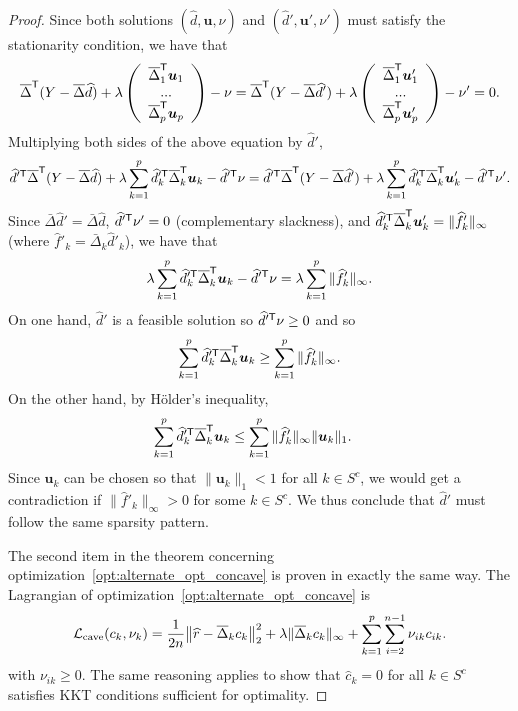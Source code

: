 \documentclass[12pt,pdftex,aos,noinfoline,addressasfootnote]{imsart}
\begin{document}
\begin{proof}
Since both solutions $(\hat{d}, \mathbf{u}, \nu)$ and $(\hat{d}',
\mathbf{u}', \nu')$ must satisfy the stationarity condition, we have
that
\[
\overline{\Delta}^{\mathsf{T}} ( Y - \overline{\Delta} \widehat{d} ) 
   + \lambda \left( \begin{array}{c} 
          \overline{\Delta}_1^{\mathsf{T}} \mbox{\boldmath $u$}_1  
          \\ ... \\ \overline{\Delta}_p^{\mathsf{T}} \mbox{\boldmath $u$}_p \end{array} \right)
    - \nu = 
\overline{\Delta}^{\mathsf{T}} ( Y - \overline{\Delta} \widehat{d}' ) 
   + \lambda \left( \begin{array}{c} 
          \overline{\Delta}_1^{\mathsf{T}} \mbox{\boldmath $u$}'_1  
          \\ ... \\ \overline{\Delta}_p^{\mathsf{T}} \mbox{\boldmath $u$}'_p \end{array} \right)
 - \nu' = 0.
\] 
Multiplying both sides of the above equation by $\hat{d}'$,
\[
\widehat{d}'^{\mathsf{T}}  \overline{\Delta}^{\mathsf{T}} ( Y - \overline{\Delta} \widehat{d} ) 
    + \lambda \sum_{k=1}^p \widehat{d}'^{\mathsf{T}}_k \overline{\Delta}_k^{\mathsf{T}} \mbox{\boldmath $u$}_k - \widehat{d}'^{\mathsf{T}} \nu = \widehat{d}'^{\mathsf{T}}  \overline{\Delta}^{\mathsf{T}} ( Y - \overline{\Delta} \widehat{d}' ) 
    + \lambda \sum_{k=1}^p \widehat{d}'^{\mathsf{T}}_k \overline{\Delta}_k^{\mathsf{T}} \mbox{\boldmath $u$}'_k - \widehat{d}'^{\mathsf{T}} \nu'.
\]
Since $\bar{\Delta} \hat{d}' = \bar{\Delta} \hat{d}$, $\widehat{d}'^{\mathsf{T}} \nu' = 0$ (complementary slackness), and $\widehat{d}'^{\mathsf{T}}_k \overline{\Delta}_k^{\mathsf{T}} \mbox{\boldmath $u$}'_k  = \| \widehat{f}'_k \|_\infty$ (where $\hat{f}'_k = \bar{\Delta}_k \hat{d}'_k$), we have that
\[
\lambda \sum_{k=1}^p \widehat{d}'^{\mathsf{T}}_k \overline{\Delta}_k^{\mathsf{T}} \mbox{\boldmath $u$}_k - \widehat{d}'^{\mathsf{T}} \nu = \lambda \sum_{k=1}^p \| \widehat{f}'_k \|_\infty.
\]
On one hand, $\hat{d}'$ is a feasible solution so $\widehat{d}'^{\mathsf{T}} \nu \geq 0$ and so 
\[
\sum_{k=1}^p \widehat{d}'^{\mathsf{T}}_k \overline{\Delta}_k^{\mathsf{T}} \mbox{\boldmath $u$}_k \geq \sum_{k=1}^p \| \widehat{f}'_k \|_\infty .
\]
On the other hand, by H\"older's inequality,
\begin{align*}
\sum_{k=1}^p \widehat{d}'^{\mathsf{T}}_k \overline{\Delta}_k^{\mathsf{T}} \mbox{\boldmath $u$}_k &\leq 
   \sum_{k=1}^p \| \widehat{f}'_k \|_\infty \|\mbox{\boldmath $u$}_k \|_1 .
\end{align*}
Since $\mathbf{u}_k$ can be chosen so that $\| \mathbf{u}_k \|_1 < 1$ for all $k \in S^c$, we would get a contradiction if $\| \hat{f}'_k \|_\infty > 0$ for some $k \in S^c$. We thus conclude that $\hat{d}'$ must follow the same sparsity pattern.


The second item in the theorem concerning optimization~\ref{opt:alternate_opt_concave} is proven in exactly the same way. 
The Lagrangian of optimization~\ref{opt:alternate_opt_concave} is
\[
\mathcal{L}_{\textrm{cave}}(c_k, \nu_k) = 
  \frac{1}{2n} \big\| \widehat{r} - \overline{\Delta}_k c_k \big \|_2^2 + 
  \lambda \| \overline{\Delta}_k c_k \|_\infty + \sum_{k=1}^p \sum_{i=2}^{n-1} \nu_{ik} c_{ik}.
\]
with $\nu_{ik} \geq 0$.
The same reasoning applies to show that $\hat{c}_k = 0$ for all $k\in S^c$ satisfies KKT conditions sufficient for optimality.
\end{proof}
 
\end{document}
